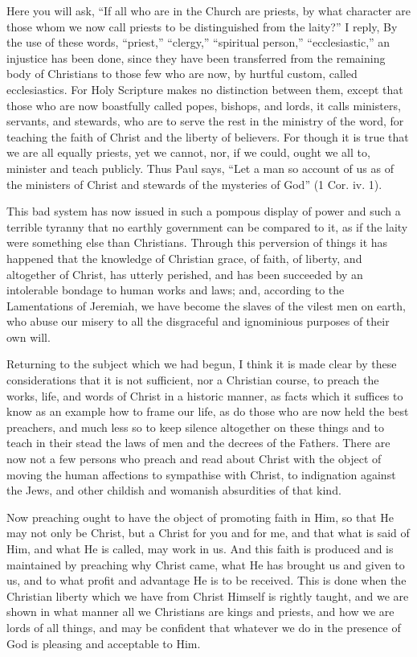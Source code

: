 Here you will ask, ``If all who are in the Church are priests, by what
character are those whom we now call priests to be distinguished from the
laity?'' I reply, By the use of these words, ``priest,'' ``clergy,'' ``spiritual
person,'' ``ecclesiastic,'' an injustice has been done, since they have been
transferred from the remaining body of Christians to those few who are
now, by hurtful custom, called ecclesiastics. For Holy Scripture makes no
distinction between them, except that those who are now boastfully called
popes, bishops, and lords, it calls ministers, servants, and stewards, who
are to serve the rest in the ministry of the word, for teaching the faith
of Christ and the liberty of believers. For though it is true that we are
all equally priests, yet we cannot, nor, if we could, ought we all to,
minister and teach publicly. Thus Paul says, ``Let a man so account of us
as of the ministers of Christ and stewards of the mysteries of God'' (1
Cor. iv. 1).

This bad system has now issued in such a pompous display of power and such
a terrible tyranny that no earthly government can be compared to it, as if
the laity were something else than Christians. Through this perversion of
things it has happened that the knowledge of Christian grace, of faith, of
liberty, and altogether of Christ, has utterly perished, and has been
succeeded by an intolerable bondage to human works and laws; and,
according to the Lamentations of Jeremiah, we have become the slaves of
the vilest men on earth, who abuse our misery to all the disgraceful and
ignominious purposes of their own will.

Returning to the subject which we had begun, I think it is made clear by
these considerations that it is not sufficient, nor a Christian course, to
preach the works, life, and words of Christ in a historic manner, as facts
which it suffices to know as an example how to frame our life, as do those
who are now held the best preachers, and much less so to keep silence
altogether on these things and to teach in their stead the laws of men and
the decrees of the Fathers. There are now not a few persons who preach and
read about Christ with the object of moving the human affections to
sympathise with Christ, to indignation against the Jews, and other
childish and womanish absurdities of that kind.

Now preaching ought to have the object of promoting faith in Him, so that
He may not only be Christ, but a Christ for you and for me, and that what
is said of Him, and what He is called, may work in us. And this faith is
produced and is maintained by preaching why Christ came, what He has
brought us and given to us, and to what profit and advantage He is to be
received. This is done when the Christian liberty which we have from
Christ Himself is rightly taught, and we are shown in what manner all we
Christians are kings and priests, and how we are lords of all things, and
may be confident that whatever we do in the presence of God is pleasing
and acceptable to Him.

